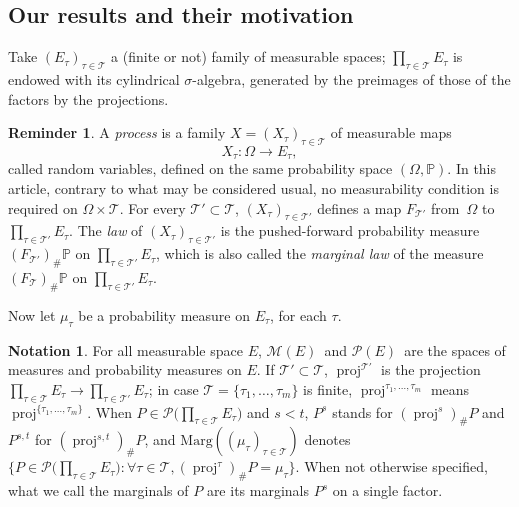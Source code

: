 \documentclass[JEP,XML,SOM,Unicode,NoEqCountersInSection,NoFloatCountersInSection,published]{cedram}
\theoremstyle{plain}
\theoremstyle{definition}
\newtheorem{notation}[them]{Notation} %
\newtheorem{reminder}[them]{Reminder}
\newcommand{\espace}{E}
\newcommand{\Tt}{{\mathcal T}}
\renewcommand{\P}{\mathbb{P}}
\newcommand{\p}{\mathcal{P}}
\newcommand{\m}{\mathcal{M}}
\newcommand{\ma}{\mathrm{Marg}}
\newcommand{\pr}{\operatorname{proj}}
\begin{document}
\subsection{Our results and their motivation}\label{subsec:resultats}

Take $(\espace_\tau)_{\tau\in\Tt}$ a (finite or not) family of measurable spaces; $\prod_{\tau\in\Tt}\espace_\tau$ is endowed with its cylindrical $\sigma$-algebra, generated by the preimages of those of the factors by the projections.

\begin{reminder}\label{reminder:process}
A \emph{process}
is a family $X=(X_\tau)_{\tau\in\Tt}$ of measurable maps
\[
X_\tau:\Omega\to \espace_\tau,
\]
called random variables, defined on the same probability space $(\Omega,\P)$. In this article, contrary to what may be considered usual, no measurability condition is required on $\Omega\times \Tt$. For every $\Tt'\subset \Tt$, $(X_\tau)_{\tau\in\Tt'}$ defines a map $F_{\Tt'}$ from~$\Omega$ to $\prod_{\tau\in\Tt'}\espace_\tau$. The \emph{law} of $(X_\tau)_{\tau\in\Tt'}$ is the pushed-forward probability measure $(F_{\Tt'})_\#\P$ on $\prod_{\tau\in\Tt'}\espace_\tau$, which is also called the \emph{marginal law} of the measure $(F_{\Tt})_\#\P$ on $\prod_{\tau\in\Tt'}\espace_\tau$. \end{reminder}

Now let $\mu_\tau$ be a probability measure on $E_\tau$, for each $\tau$.

\begin{notation}\label{notation:marg} For all measurable space $E$, $\m(E)$\ and $\p(E)$\ are the spaces of measures and probability measures on $E$. If $\Tt'\subset\Tt$, $\pr^{\Tt'}$ is the projection $\prod_{\tau\in\Tt}E_\tau\to\prod_{\tau\in\Tt'}E_\tau$; in case $\Tt=\{\tau_1,\ldots,\tau_m\}$ is finite, $\pr^{\tau_1,\ldots,\tau_m}$ means $\pr^{\{\tau_1,\ldots,\tau_m\}}$. When $P\in\p\bigl(\prod_{\tau\in\Tt}\espace_\tau\bigr)$ and $s<t$, $P^s$ stands for $(\pr^{s})_\#P$ and $P^{s,t}$ for $(\pr^{s,t})_\#P$, and $\ma((\mu_\tau)_{\tau\in\Tt})$ denotes $\{P\in\p\bigl(\prod_{\tau\in\Tt}\espace_\tau\bigr):\forall\tau\in\Tt,(\pr^\tau)_\#P=\mu_\tau\}$. When not otherwise specified, what we call the marginals of $P$ are its marginals $P^s$ on a single factor.
\end{notation}
\end{document}
